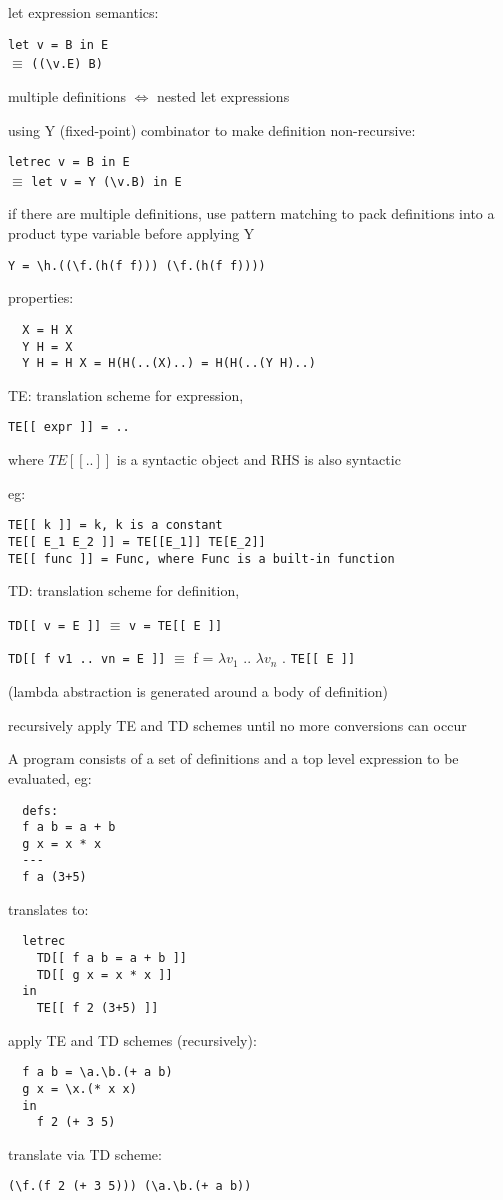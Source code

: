 \documentclass[8pt]{extarticle}
\begin{document}
\begin{multicols*}{2}
  let expression semantics:
  
  \verb|let v = B in E|\\
  $\equiv$ \verb|((\v.E) B)|
  
  multiple definitions $\iff$ nested let expressions

  using Y (fixed-point) combinator to make definition non-recursive:
  
  \verb|letrec v = B in E|\\
  $\equiv$ \verb|let v = Y (\v.B) in E|

  if there are multiple definitions, use pattern matching to pack definitions into a product type variable before applying Y

  \verb|Y = \h.((\f.(h(f f))) (\f.(h(f f))))|
  
  properties:
\begin{verbatim}
  X = H X
  Y H = X
  Y H = H X = H(H(..(X)..) = H(H(..(Y H)..)
\end{verbatim}
  
  TE: translation scheme for expression,
\begin{verbatim}
TE[[ expr ]] = ..
\end{verbatim}
  where $TE[[..]]$ is a syntactic object and RHS is also syntactic

  eg:
\begin{verbatim}
TE[[ k ]] = k, k is a constant
TE[[ E_1 E_2 ]] = TE[[E_1]] TE[E_2]]
TE[[ func ]] = Func, where Func is a built-in function
\end{verbatim}

  TD: translation scheme for definition,

  \verb|TD[[ v = E ]]| $\equiv$ \verb|v = TE[[ E ]]|
  
  \verb|TD[[ f v1 .. vn = E ]]| $\equiv$ f = $\lambda v_1$ .. $\lambda v_n$ . \verb|TE[[ E ]]|

  (lambda abstraction is generated around a body of definition)

  recursively apply TE and TD schemes until no more conversions can occur

  A program consists of a set of definitions and a top level expression to be evaluated, eg:
\begin{verbatim}
  defs:
  f a b = a + b
  g x = x * x
  ---
  f a (3+5)
\end{verbatim}
  translates to:
\begin{verbatim}
  letrec
    TD[[ f a b = a + b ]]
    TD[[ g x = x * x ]]
  in
    TE[[ f 2 (3+5) ]]
\end{verbatim}
  apply TE and TD schemes (recursively):
\begin{verbatim}
  f a b = \a.\b.(+ a b)
  g x = \x.(* x x)
  in
    f 2 (+ 3 5)
\end{verbatim}
  translate via TD scheme:
\begin{verbatim}
(\f.(f 2 (+ 3 5))) (\a.\b.(+ a b))
\end{verbatim}


\end{multicols*}
\end{document}
